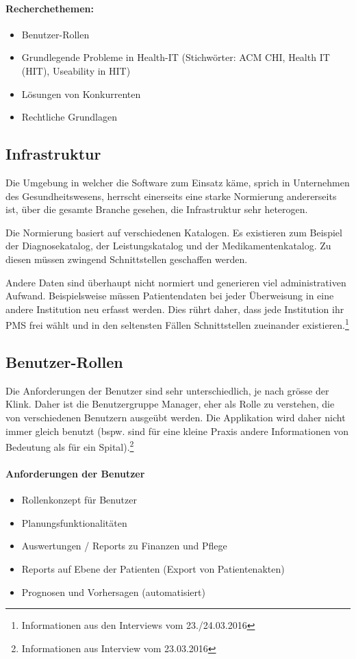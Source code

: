\documentclass[a4paper]{scrreprt}
\begin{document}
\paragraph{Recherchethemen:} 
\begin{itemize}
\item Benutzer-Rollen
\item Grundlegende Probleme in Health-IT (Stichwörter: ACM CHI, Health IT (HIT), Useability in HIT)
\item Lösungen von Konkurrenten
\item Rechtliche Grundlagen
\end{itemize}

\subsection{Infrastruktur}
Die Umgebung in welcher die Software zum Einsatz käme, sprich in Unternehmen des Gesundheitswesens,
herrscht einerseits eine starke Normierung andererseits ist, über die gesamte Branche gesehen, die
Infrastruktur sehr heterogen.

Die Normierung basiert auf verschiedenen Katalogen. Es existieren zum Beispiel der Diagnosekatalog,
der Leistungskatalog und der Medikamentenkatalog. Zu diesen müssen zwingend Schnittstellen
geschaffen werden.

Andere Daten sind überhaupt nicht normiert und generieren viel administrativen Aufwand. Beispielsweise
müssen Patientendaten bei jeder Überweisung in eine andere Institution neu erfasst werden. Dies rührt
daher, dass jede Institution ihr PMS frei wählt und in den seltensten Fällen Schnittstellen
zueinander existieren.\footnote{Informationen aus den Interviews vom 23./24.03.2016}

\subsection{Benutzer-Rollen}
Die Anforderungen der Benutzer sind sehr unterschiedlich, je nach grösse der Klink. Daher ist die Benutzergruppe Manager, eher als Rolle zu verstehen, die von verschiedenen Benutzern ausgeübt werden. Die Applikation wird daher nicht immer gleich benutzt (bspw. sind für eine kleine Praxis andere Informationen von Bedeutung als für ein Spital).\footnote{Informationen aus Interview vom 23.03.2016}

\paragraph{Anforderungen der Benutzer}
\begin{itemize}
\item Rollenkonzept für Benutzer
\item Planungsfunktionalitäten
\item Auswertungen / Reports zu Finanzen und Pflege
\item Reports auf Ebene der Patienten (Export von Patientenakten)
\item Prognosen und Vorhersagen (automatisiert)
\end{itemize}
\end{document}
